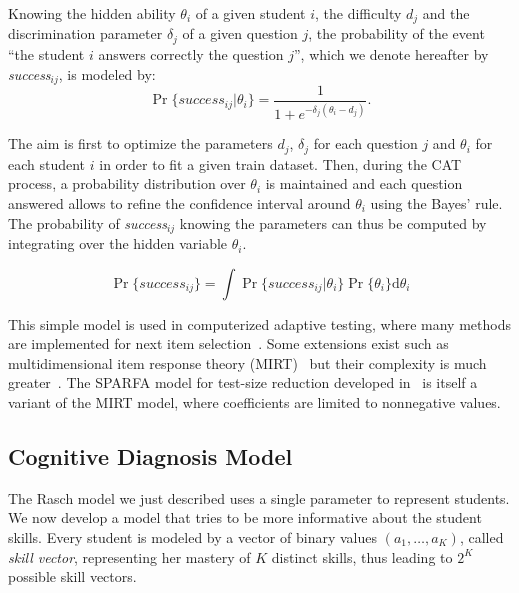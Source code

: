 \documentclass{edm_template}
\begin{document}
Knowing the hidden ability $\theta_i$ of a given student $i$, the difficulty $d_j$ and the discrimination parameter $\delta_j$ of a given question $j$, the probability of the event ``the student $i$ answers correctly the question $j$'', which we denote hereafter by \emph{success}$_{ij}$, is modeled by:
\[ \Pr\{success_{ij}|\theta_i\} = \frac1{1+e^{-\delta_j(\theta_i - d_j)}}. \]

The aim is first to optimize the parameters $d_j$, $\delta_j$ for each question $j$ and $\theta_i$ for each student $i$ in order to fit a given train dataset. Then, during the CAT process, a probability distribution over $\theta_i$ is maintained and each question answered allows to refine the confidence interval around $\theta_i$ using the Bayes' rule. The probability of \emph{success}$_{ij}$ knowing the parameters can thus be computed by integrating over the hidden variable $\theta_i$.

\[ \Pr\{success_{ij}\} = \int \Pr\{success_{ij}|\theta_i\} \Pr\{\theta_i\} \mathrm d\theta_i \]

This simple model is used in computerized adaptive testing, where many methods are implemented for next item selection~\cite{MagisRaiche2012}. Some extensions exist such as multidimensional item response theory (MIRT)~\cite{Segall1996} but their complexity is much greater~\cite{Desmarais2012}. The SPARFA model for test-size reduction developed in~\cite{Vats2013} is itself a variant of the MIRT model, where coefficients are limited to nonnegative values.

\subsection{Cognitive Diagnosis Model}

The Rasch model we just described uses a single parameter to represent students. We now develop a model that tries to be more informative about the student skills. Every student is modeled by a vector of binary values $(a_1, \ldots, a_K)$, called \emph{skill vector}, representing her mastery of $K$ distinct skills, thus leading to $2^K$ possible skill vectors. 
\end{document}
